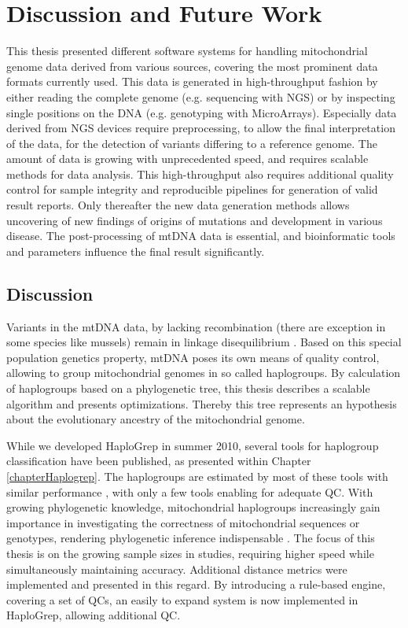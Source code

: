 \chapter{Discussion and Future Work}
\label{outlook}

This thesis presented different software systems for handling mitochondrial genome data derived from various sources, covering the most prominent data formats currently used. This data is generated in high-throughput fashion by either reading the complete genome (e.g. sequencing with NGS) or by inspecting single positions on the DNA (e.g. genotyping with MicroArrays). Especially data derived from NGS devices require preprocessing, to allow the final interpretation of the data, for the detection of variants differing to a reference genome. The amount of data is growing with unprecedented speed, and requires scalable methods for data analysis. This high-throughput also requires additional quality control for sample integrity and reproducible pipelines for generation of valid result reports. Only thereafter the new data generation methods allows uncovering of new findings of origins of mutations and development in various disease. The post-processing of mtDNA data is essential, and bioinformatic tools and parameters influence the final result significantly. 
\section{Discussion}
\label{disc:sec1}
Variants in the mtDNA data, by lacking recombination (there are exception in some species like mussels) remain in linkage disequilibrium \cite{Wallace2013}. Based on this special population genetics property, mtDNA poses its own means of quality control, allowing to group mitochondrial genomes in so called haplogroups. By calculation of haplogroups based on a phylogenetic tree, this thesis describes a scalable algorithm and presents optimizations.  Thereby this tree represents an hypothesis about the evolutionary ancestry of the mitochondrial genome. 

While we developed HaploGrep in summer 2010, several tools for haplogroup classification  have been published, as presented within Chapter \ref{chapterHaplogrep}. The haplogroups are estimated by most of these tools with similar performance \cite{Bandelt2012}, with only a few tools enabling for adequate QC. With growing phylogenetic knowledge, mitochondrial haplogroups increasingly gain importance in investigating the correctness of mitochondrial sequences or genotypes, rendering phylogenetic inference indispensable \cite{Weissensteiner2016a}. The focus of this thesis is on the growing sample sizes in studies, requiring higher speed while simultaneously maintaining accuracy. 
Additional distance metrics were implemented and presented in this regard. By introducing a rule-based engine, covering a set of QCs, an easily to expand system is now implemented in HaploGrep, allowing additional QC. 

